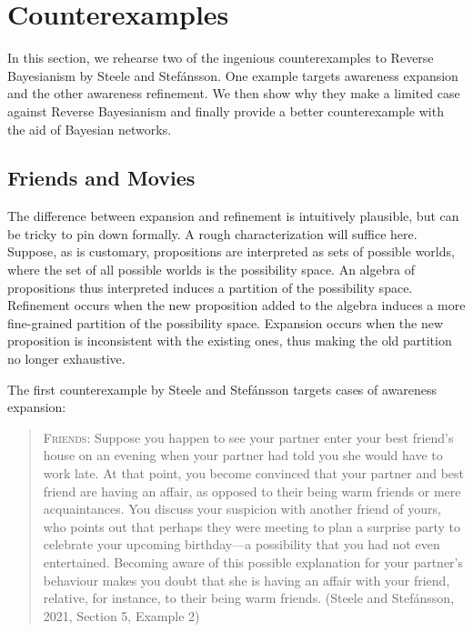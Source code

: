 \documentclass[
  11pt,
  dvipsnames,enabledeprecatedfontcommands]{scrartcl}
\begin{document}
\hypertarget{counterexamples}{%
\section{Counterexamples}\label{counterexamples}}

In this section, we rehearse two of the ingenious counterexamples to
Reverse Bayesianism by Steele and Stefánsson. One example targets
awareness expansion and the other awareness refinement. We then show why
they make a limited case against Reverse Bayesianism and finally provide
a better counterexample with the aid of Bayesian networks.

\hypertarget{friends-and-movies}{%
\subsection{Friends and Movies}\label{friends-and-movies}}

\label{sec:counterexamples}

The difference between expansion and refinement is intuitively
plausible, but can be tricky to pin down formally. A rough
characterization will suffice here. Suppose, as is customary,
propositions are interpreted as sets of possible worlds, where the set
of all possible worlds is the possibility space. An algebra of
propositions thus interpreted induces a partition of the possibility
space. Refinement occurs when the new proposition added to the algebra
induces a more fine-grained partition of the possibility space.
Expansion occurs when the new proposition is inconsistent with the
existing ones, thus making the old partition no longer exhaustive.

The first counterexample by Steele and Stefánsson targets cases of
awareness expansion:

\begin{quote}
\textsc{Friends}: Suppose you happen to see your partner enter your best
friend's house on an evening when your partner had told you she would
have to work late. At that point, you become convinced that your partner
and best friend are having an affair, as opposed to their being warm
friends or mere acquaintances. You discuss your suspicion with another
friend of yours, who points out that perhaps they were meeting to plan a
surprise party to celebrate your upcoming birthday---a possibility that
you had not even entertained. Becoming aware of this possible
explanation for your partner's behaviour makes you doubt that she is
having an affair with your friend, relative, for instance, to their
being warm friends. (Steele and Stefánsson, 2021, Section 5, Example 2)
\end{quote}
\end{document}
